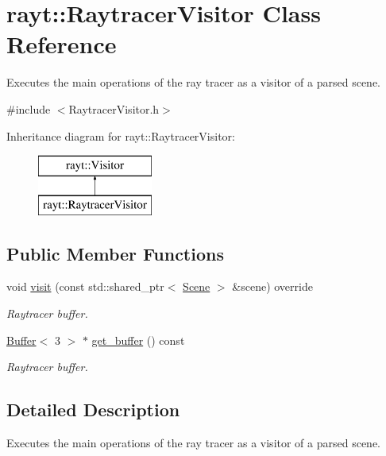 \hypertarget{classrayt_1_1_raytracer_visitor}{}\section{rayt\+::Raytracer\+Visitor Class Reference}
\label{classrayt_1_1_raytracer_visitor}


Executes the main operations of the ray tracer as a visitor of a parsed scene.  




{\ttfamily \#include $<$Raytracer\+Visitor.\+h$>$}

Inheritance diagram for rayt\+::Raytracer\+Visitor\+:\begin{figure}[H]
\begin{center}
\leavevmode
\includegraphics[height=2.000000cm]{classrayt_1_1_raytracer_visitor}
\end{center}
\end{figure}
\subsection*{Public Member Functions}
\begin{DoxyCompactItemize}
\item 
void \mbox{\hyperlink{classrayt_1_1_raytracer_visitor_ac469c21e8ac5e9a01ca6a58108bc860e}{visit}} (const std\+::shared\+\_\+ptr$<$ \mbox{\hyperlink{classrayt_1_1_scene}{Scene}} $>$ \&scene) override
\begin{DoxyCompactList}\small\item\em Raytracer buffer. \end{DoxyCompactList}\item 
\mbox{\hyperlink{classrayt_1_1_buffer}{Buffer}}$<$ 3 $>$ $\ast$ \mbox{\hyperlink{classrayt_1_1_raytracer_visitor_aecfbe163d3bf3ba0e88ab64d6abdec60}{get\+\_\+buffer}} () const
\begin{DoxyCompactList}\small\item\em Raytracer buffer. \end{DoxyCompactList}\end{DoxyCompactItemize}


\subsection{Detailed Description}
Executes the main operations of the ray tracer as a visitor of a parsed scene. 

